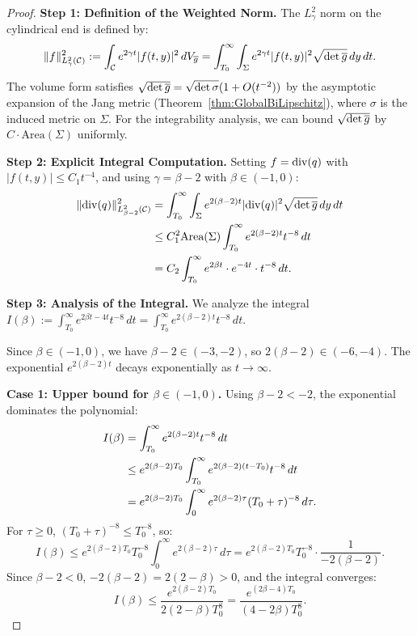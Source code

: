 \begin{proof}
\textbf{Step 1: Definition of the Weighted Norm.}
The $L^2_\gamma$ norm on the cylindrical end is defined by:
\begin{equation}
    \|f\|_{L^2_\gamma(\mathcal{C})}^2 := \int_{\mathcal{C}} e^{2\gamma t} |f(t,y)|^2 \, dV_{\overline{g}} = \int_{T_0}^\infty \int_\Sigma e^{2\gamma t} |f(t,y)|^2 \sqrt{\det \overline{g}} \, dy \, dt.
\end{equation}
The volume form satisfies $\sqrt{\det \overline{g}} = \sqrt{\det \sigma}(1 + O(t^{-2}))$ by the asymptotic expansion of the Jang metric (Theorem~\ref{thm:GlobalBiLipschitz}), where $\sigma$ is the induced metric on $\Sigma$. For the integrability analysis, we can bound $\sqrt{\det \overline{g}}$ by $C \cdot \text{Area}(\Sigma)$ uniformly.

\textbf{Step 2: Explicit Integral Computation.}
Setting $f = \mathrm{div}(q)$ with $|f(t,y)| \le C_1 t^{-4}$, and using $\gamma = \beta - 2$ with $\beta \in (-1, 0)$:
\begin{align}
    \|\mathrm{div}(q)\|_{L^2_{\beta-2}(\mathcal{C})}^2 &= \int_{T_0}^\infty \int_\Sigma e^{2(\beta-2)t} |\mathrm{div}(q)|^2 \sqrt{\det \overline{g}} \, dy \, dt \notag \\
    &\le C_1^2 \text{Area}(\Sigma) \int_{T_0}^\infty e^{2(\beta-2)t} t^{-8} \, dt \notag \\
    &= C_2 \int_{T_0}^\infty e^{2\beta t} \cdot e^{-4t} \cdot t^{-8} \, dt. \label{eq:IntegralMain}
\end{align}

\textbf{Step 3: Analysis of the Integral.}
We analyze the integral $I(\beta) := \int_{T_0}^\infty e^{2\beta t - 4t} t^{-8} \, dt = \int_{T_0}^\infty e^{2(\beta-2)t} t^{-8} \, dt$.

Since $\beta \in (-1, 0)$, we have $\beta - 2 \in (-3, -2)$, so $2(\beta - 2) \in (-6, -4)$. The exponential $e^{2(\beta-2)t}$ decays exponentially as $t \to \infty$.

\textbf{Case 1: Upper bound for $\beta \in (-1, 0)$.}
Using $\beta - 2 < -2$, the exponential dominates the polynomial:
\begin{align}
    I(\beta) &= \int_{T_0}^\infty e^{2(\beta-2)t} t^{-8} \, dt \notag \\
    &\le e^{2(\beta-2)T_0} \int_{T_0}^\infty e^{2(\beta-2)(t-T_0)} t^{-8} \, dt \notag \\
    &= e^{2(\beta-2)T_0} \int_0^\infty e^{2(\beta-2)\tau} (T_0 + \tau)^{-8} \, d\tau. \label{eq:IntegralShift}
\end{align}
For $\tau \ge 0$, $(T_0 + \tau)^{-8} \le T_0^{-8}$, so:
\begin{equation}
    I(\beta) \le e^{2(\beta-2)T_0} T_0^{-8} \int_0^\infty e^{2(\beta-2)\tau} \, d\tau = e^{2(\beta-2)T_0} T_0^{-8} \cdot \frac{1}{-2(\beta-2)}.
\end{equation}
Since $\beta - 2 < 0$, $-2(\beta-2) = 2(2-\beta) > 0$, and the integral converges:
\begin{equation}
    I(\beta) \le \frac{e^{2(\beta-2)T_0}}{2(2-\beta) T_0^8} = \frac{e^{(2\beta-4)T_0}}{(4-2\beta) T_0^8}.
\end{equation}


\end{proof}
